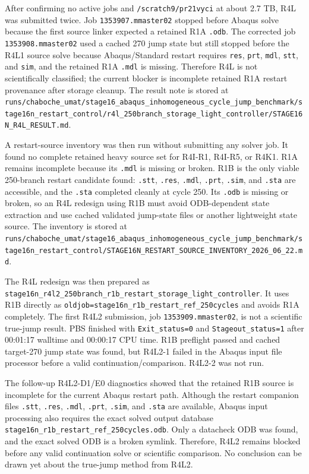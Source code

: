 \documentclass[11pt,a4paper]{article}
\newcommand{\code}[1]{\texttt{#1}}
\begin{document}
After confirming no active jobs and \code{/scratch9/pr21vyci} at about 2.7 TB, R4L was submitted twice. Job \code{1353907.mmaster02} stopped before Abaqus solve because the first source linker expected a retained R1A \code{.odb}. The corrected job \code{1353908.mmaster02} used a cached 270 jump state but still stopped before the R4L1 source solve because Abaqus/Standard restart requires \code{res}, \code{prt}, \code{mdl}, \code{stt}, and \code{sim}, and the retained R1A \code{.mdl} is missing. Therefore R4L is not scientifically classified; the current blocker is incomplete retained R1A restart provenance after storage cleanup. The result note is stored at \code{runs/chaboche\_umat/stage16\_abaqus\_inhomogeneous\_cycle\_jump\_benchmark/stage16n\_restart\_control/r4l\_250branch\_storage\_light\_controller/STAGE16N\_R4L\_RESULT.md}.

A restart-source inventory was then run without submitting any solver job. It found no complete retained heavy source set for R4I-R1, R4I-R5, or R4K1. R1A remains incomplete because its \code{.mdl} is missing or broken. R1B is the only viable 250-branch restart candidate found: \code{.stt}, \code{.res}, \code{.mdl}, \code{.prt}, \code{.sim}, and \code{.sta} are accessible, and the \code{.sta} completed cleanly at cycle 250. Its \code{.odb} is missing or broken, so an R4L redesign using R1B must avoid ODB-dependent state extraction and use cached validated jump-state files or another lightweight state source. The inventory is stored at \code{runs/chaboche\_umat/stage16\_abaqus\_inhomogeneous\_cycle\_jump\_benchmark/stage16n\_restart\_control/STAGE16N\_RESTART\_SOURCE\_INVENTORY\_2026\_06\_22.md}.

The R4L redesign was then prepared as \code{stage16n\_r4l2\_250branch\_r1b\_restart\_storage\_light\_controller}. It uses R1B directly as \code{oldjob=stage16n\_r1b\_restart\_ref\_250cycles} and avoids R1A completely. The first R4L2 submission, job \code{1353909.mmaster02}, is not a scientific true-jump result. PBS finished with \code{Exit\_status=0} and \code{Stageout\_status=1} after 00:01:17 walltime and 00:00:17 CPU time. R1B preflight passed and cached target-270 jump state was found, but R4L2-1 failed in the Abaqus input file processor before a valid continuation/comparison. R4L2-2 was not run.

The follow-up R4L2-D1/E0 diagnostics showed that the retained R1B source is incomplete for the current Abaqus restart path. Although the restart companion files \code{.stt}, \code{.res}, \code{.mdl}, \code{.prt}, \code{.sim}, and \code{.sta} are available, Abaqus input processing also requires the exact solved output database \code{stage16n\_r1b\_restart\_ref\_250cycles.odb}. Only a datacheck ODB was found, and the exact solved ODB is a broken symlink. Therefore, R4L2 remains blocked before any valid continuation solve or scientific comparison. No conclusion can be drawn yet about the true-jump method from R4L2.
\end{document}
